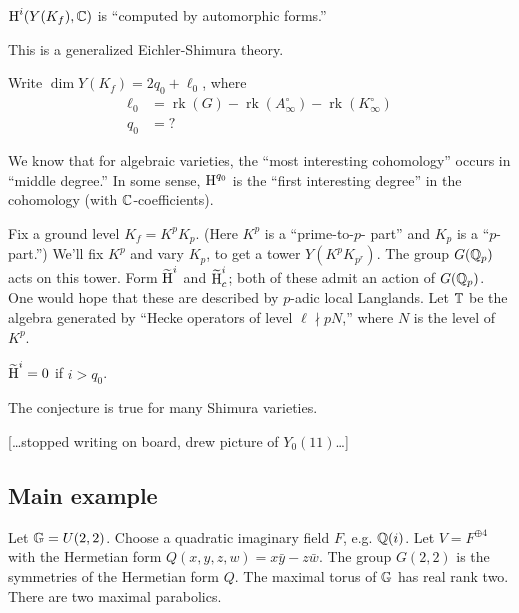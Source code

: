 \begin{theorem}[Franke]
$\operatorname{H}^i(Y(K_f),\mathbb{C})$ is ``computed by automorphic forms.'' 
\end{theorem}

This is a generalized Eichler-Shimura theory. 

Write $\dim Y(K_f)=2 q_0+\ell_0$, where 
\begin{align*}
  \ell_0 &= \operatorname{rk}(G) - \operatorname{rk}(A_\infty^\circ) - \operatorname{rk}(K_\infty^\circ) \\
  q_0 &= ?
\end{align*}

We know that for algebraic varieties, the ``most interesting cohomology'' occurs 
in ``middle degree.'' In some sense, $\operatorname{H}^{q_0}$ is the ``first interesting degree'' in the 
cohomology (with $\mathbb{C}$-coefficients). 

Fix a ground level $K_f=K^p K_p$. (Here $K^p$ is a ``prime-to-$p$- part'' and 
$K_p$ is a ``$p$-part.'') We'll fix $K^p$ and vary $K_p$, to get a tower 
$Y(K^p K_{p^r})$. The group $G(\mathbb{Q}_p)$ acts on this tower. Form 
$\widetilde{\operatorname{H}}^i$ and $\widetilde{\operatorname{H}}_c^i$; both of these admit an action of 
$G(\mathbb{Q}_p)$. One would hope that these are described by $p$-adic local 
Langlands. Let $\mathbb{T}$ be the algebra generated by ``Hecke operators of level 
$\ell\nmid p N$,'' where $N$ is the level of $K^p$. 


\begin{conjecture}
$\widetilde {\operatorname{H}}^i{}=0$ if $i>q_0$. 
\end{conjecture}

\begin{theorem}[Scholze]
The conjecture is true for many Shimura varieties. 
\end{theorem}

[\ldots stopped writing on board, drew picture of $Y_0(11)$\ldots]





\subsection{Main example}

Let $\mathbb{G}=U(2,2)$. Choose a quadratic imaginary field $F$, e.g. $\mathbb{Q}(i)$. 
Let $V=F^{\oplus 4}$ with the Hermetian form $Q(x,y,z,w)=x\bar y-z \bar w$. 
The group $G(2,2)$ is the symmetries of the Hermetian form $Q$. The maximal 
torus of $\mathbb{G}$ has real rank two. There are two maximal parabolics. 

